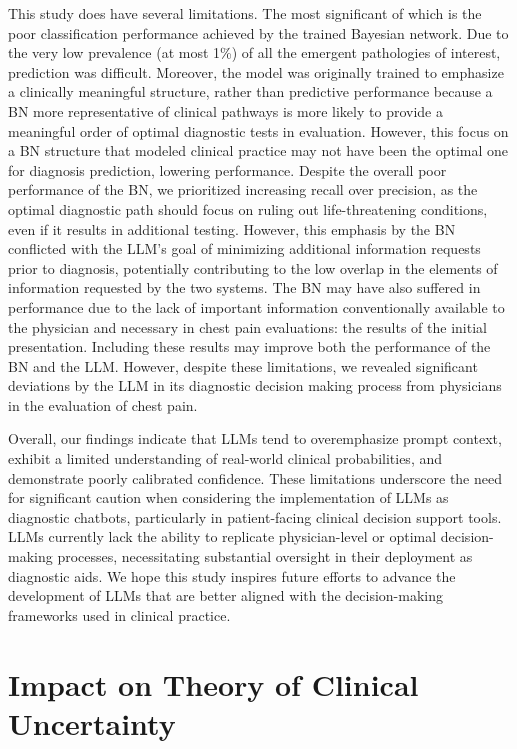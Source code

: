 This study does have several limitations. The most significant of which is the poor classification performance achieved by the trained Bayesian network. Due to the very low prevalence (at most 1\%) of all the emergent pathologies of interest, prediction was difficult. Moreover, the model was originally trained to emphasize a clinically meaningful structure, rather than predictive performance because a BN more representative of clinical  pathways is more likely to provide a meaningful order of optimal diagnostic tests in evaluation. However, this focus on a BN structure that modeled clinical practice may not have been the optimal one for diagnosis prediction, lowering performance. Despite the overall poor performance of the BN, we prioritized increasing recall over precision, as the optimal diagnostic path should focus on ruling out life-threatening conditions, even if it results in additional testing. However, this emphasis by the BN conflicted with the LLM's goal of minimizing additional information requests prior to diagnosis, potentially contributing to the low overlap in the elements of information requested by the two systems. The BN may have also suffered in performance due to the lack of important information conventionally available to the physician and necessary in chest pain evaluations: the results of the initial presentation. Including these results may improve both the performance of the BN and the LLM. However, despite these limitations, we revealed significant deviations by the LLM in its diagnostic decision making process from physicians in the evaluation of chest pain. 

Overall, our findings indicate that LLMs tend to overemphasize prompt context, exhibit a limited understanding of real-world clinical probabilities, and demonstrate poorly calibrated confidence. These limitations underscore the need for significant caution when considering the implementation of LLMs as diagnostic chatbots, particularly in patient-facing clinical decision support tools. LLMs currently lack the ability to replicate physician-level or optimal decision-making processes, necessitating substantial oversight in their deployment as diagnostic aids. We hope this study inspires future efforts to advance the development of LLMs that are better aligned with the decision-making frameworks used in clinical practice.

\section{Impact on Theory of Clinical Uncertainty}

